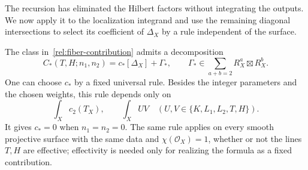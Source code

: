 The recursion has eliminated the Hilbert factors without integrating
the outputs. We now apply it to the localization integrand and use
the remaining diagonal intersections to select its coefficient of
\(\Delta_X\) by a rule independent of the surface.

\begin{proposition}
\label{prop:universal}
The class in~\eqref{rel:fiber-contribution} admits a decomposition
\begin{equation}
 C_*(T,H;n_1,n_2)=c_*[\Delta_X]+\Gamma_*,
 \qquad
 \Gamma_*\in\sum_{a+b=2}R_X^a\boxtimes R_X^b.
 \label{rel:universal-decomposition}
\end{equation}
One can choose $c_*$ by a fixed universal rule.  Besides the integer
parameters and the chosen weights, this rule depends only on
\begin{equation}
 \int_X c_2(T_X),\qquad
 \int_X UV\quad
 (U,V\in\{K,L_1,L_2,T,H\}).
 \label{rel:numerical-data}
\end{equation}
It gives $c_*=0$ when $n_1=n_2=0$.  The same rule applies on every
smooth projective surface with the same data and $\chi(\mathcal O_X)=1$,
whether or not the lines $T,H$ are effective; effectivity is needed
only for realizing the formula as a fixed contribution.
\end{proposition}

